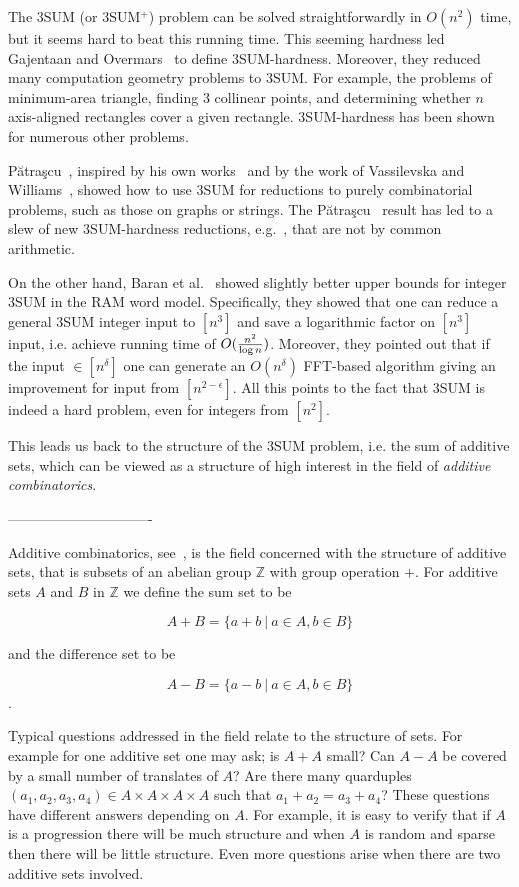 \documentclass[11pt]{article}
\newcommand{\Z}{\mathbb{Z}}
\begin{document}
{The 3SUM (or 3SUM$^+$) problem can be solved straightforwardly in $O(n^2)$ time, but it seems hard to beat this running time. This seeming hardness led Gajentaan and Overmars~\cite{GO95} to define 3SUM-hardness. Moreover, they reduced many computation geometry problems to 3SUM. For example, the problems of minimum-area triangle, finding 3 collinear points, and determining whether $n$ axis-aligned rectangles cover a given rectangle. 3SUM-hardness has been shown for numerous other problems.

P\u{a}tra\c{s}cu~\cite{Patrascu10}, inspired by his own works~\cite{BDP08,PW10} and by the work of Vassilevska and Williams~\cite{VW09}, showed how  to use 3SUM for reductions to purely combinatorial problems, such as those on graphs or strings. The P\u{a}tra\c{s}cu~\cite{Patrascu10} result has led to a slew of new 3SUM-hardness reductions, e.g.~\cite{AWW14,ACLL14,JV13,KPP14}, that are not by common arithmetic.

On the other hand, Baran et al.~\cite{BDP08} showed slightly better upper bounds for integer 3SUM in the RAM word model. Specifically, they showed that one can reduce a general 3SUM integer input to $[n^3]$ and save a logarithmic factor on $[n^3]$ input, i.e. achieve running time of $O({n^2 \over \log n})$. Moreover, they pointed out that if the input $\in [n^{\delta}]$ one can generate an $O(n^{\delta})$ FFT-based algorithm giving an improvement for input from $[n^{2-\epsilon}]$. All this points to the fact that 3SUM is indeed a hard problem, even for integers from $[n^2]$.

This leads us back to the structure of the 3SUM problem, i.e. the sum of additive sets, which can be viewed as a structure of high interest in the field of {\em additive combinatorics}.



-------------------------------




Additive combinatorics, see~\cite{TV06}, is the field concerned with the structure of additive sets, that is subsets of an abelian group $\Z$ with group operation $+$. For additive sets $A$ and $B$ in $\Z$ we define the sum set to be

$$A+B = \{a+b\ |\ a\in A, b\in B\}$$

and the difference set to be

$$A-B = \{a-b\ |\ a\in A, b\in B\}$$.


Typical questions addressed in the field relate to the structure of sets. For example for one additive set one may ask; is $A+A$ small? Can $A-A$ be covered by a small number of translates of $A$? Are there many quarduples $(a_1,a_2,a_3,a_4) \in A\times A\times A\times A$ such that $a_1+a_2 = a_3+a_4$? These questions have different answers depending on $A$. For example, it is easy to verify that if $A$ is a progression there will be much structure and when $A$ is random and sparse then there will be little structure. Even more questions arise when there are two additive sets involved.

}
\end{document}
